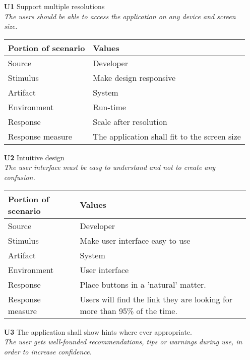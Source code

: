 \begin{itemize}
    \item[\textbf{U1}] Support multiple resolutions \\
    \textit{\small{The users should be able to access the application on any device and screen size.}}
        
    \begin{tabular}{| l | p{7cm} |}
        \hline
        \rowcolor[gray]{0.8}
        \textbf{Portion of scenario} & \textbf{Values} \\
        \hline
        Source & Developer \\
        Stimulus & Make design responsive \\
        Artifact & System \\
        Environment & Run-time \\
        Response & Scale after resolution  \\
        Response measure & The application shall fit to the screen size \\
        \hline
    \end{tabular}   

    \item[\textbf{U2}] Intuitive design \\
    \textit{\small{The user interface must be easy to understand and not to create any confusion.}}
        
    \begin{tabular}{| l | p{7cm} |}
        \hline
        \rowcolor[gray]{0.8}
        \textbf{Portion of scenario} & \textbf{Values} \\
        \hline
        Source & Developer \\
        Stimulus & Make user interface easy to use \\
        Artifact & System \\
        Environment & User interface \\
        Response & Place buttons in a 'natural' matter. \\
        Response measure & Users will find the link they are looking for more than 95\% of the time. \\
        \hline
    \end{tabular}

    \item[\textbf{U3}] The application shall show hints where ever appropriate. \\
        \textit{\small{The user gets well-founded recommendations, tips or warnings during use, in order to increase confidence.}}
        

\end{itemize}
